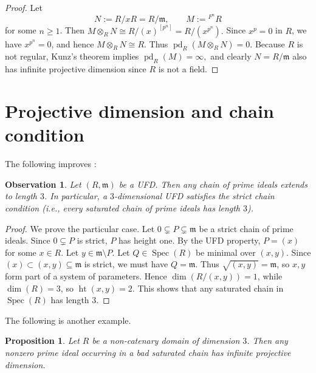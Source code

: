 \documentclass[11.05pt,a4paper]{amsart}
\newtheorem{proposition}[theorem]{Proposition}
\newtheorem{observation}[theorem]{Observation}\newcommand{\up}[1]{{{}^{#1}\!}}
\theoremstyle{definition}
\theoremstyle{remark}
\newcommand{\Spec}{\operatorname{Spec}}
\newcommand{\pd}{\operatorname{pd}}
\begin{document}
\begin{proof}
	Let
	\[
	N:=R/xR=R/\mathfrak m, \qquad M:={}^{F^n}\!R
	\]
	for some $n\ge 1$.
	Then
	\(
	M\otimes_R N \cong R/(x)^{[p^n]} = R/(x^{p^n}).
	\)
	Since $x^p=0$ in $R$, we have $x^{p^n}=0$, and hence
	\(
	M\otimes_R N \cong R.
	\)
	Thus
	\(
	\pd_R(M\otimes_R N)=0.
	\)
	Because $R$ is not regular, Kunz’s theorem implies
	\(
	\pd_R(M)=\infty,
	\)
	and clearly $N=R/\mathfrak m$ also has infinite projective dimension since $R$ is not a field.
\end{proof}
\medskip
\section{Projective dimension and chain condition}

The following improves \cite[Proposition II.3]{S}:

\begin{observation}
	Let $(R,\mathfrak{m})$ be a UFD. Then any chain of prime ideals extends to length $3$.  
	In particular, a $3$-dimensional UFD satisfies the strict chain condition (i.e., every saturated chain of prime ideals has length $3$).
\end{observation}

\begin{proof}
	We prove the particular case. Let $0 \subsetneq P \subsetneq \mathfrak{m}$ be a strict chain of prime ideals. Since $0 \subsetneq P$ is strict, $P$ has height one. By the UFD property, $P = (x)$ for some $x \in R$. Let $y \in \mathfrak{m} \setminus P$. Let $Q \in \Spec(R)$ be minimal over $(x,y)$. Since $(x) \subset (x,y) \subseteq \mathfrak{m}$ is strict, we must have $Q = \mathfrak{m}$. Thus $\sqrt{(x,y)} = \mathfrak{m}$, so $x,y$ form part of a system of parameters. Hence $\dim (R/(x,y)) = 1$, while $\dim(R)=3$, so $\operatorname{ht}(x,y) = 2$. This shows that any saturated chain in $\Spec(R)$ has length $3$.
\end{proof}

The following is another example.

\begin{proposition}\label{s}
	Let $R$ be a non-catenary domain of dimension $3$. Then any nonzero prime ideal occurring in a bad saturated chain has infinite projective dimension.
\end{proposition}
\end{document}
